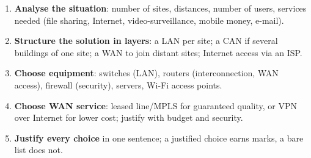 \documentclass[11pt]{article}
\begin{document}
\begin{methode}
\begin{enumerate}
\item \textbf{Analyse the situation}: number of sites, distances, number of users, services needed (file sharing, Internet, video-surveillance, mobile money, e-mail).
\item \textbf{Structure the solution in layers}: a LAN per site; a CAN if several buildings of one site; a WAN to join distant sites; Internet access via an ISP.
\item \textbf{Choose equipment}: switches (LAN), routers (interconnection, WAN access), firewall (security), servers, Wi-Fi access points.
\item \textbf{Choose WAN service}: leased line/MPLS for guaranteed quality, or VPN over Internet for lower cost; justify with budget and security.
\item \textbf{Justify every choice} in one sentence; a justified choice earns marks, a bare list does not.
\end{enumerate}
\end{methode}
\end{document}
